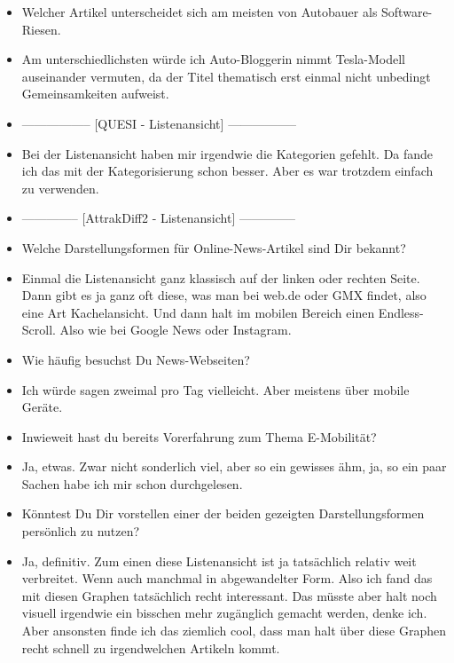{\begin{itemize}[]
        \item {} Welcher Artikel unterscheidet sich am meisten von \flqq Autobauer als Software-Riesen\frqq{}.
        \item {} Am unterschiedlichsten würde ich \flqq Auto-Bloggerin nimmt Tesla-Modell auseinander\frqq{} vermuten, da der Titel thematisch erst einmal nicht unbedingt Gemeinsamkeiten aufweist.
        \item {-----------------} [QUESI - Listenansicht] {-----------------}
        \item {} Bei der Listenansicht haben mir irgendwie die Kategorien gefehlt.
              Da fande ich das mit der Kategorisierung schon besser.
              Aber es war trotzdem einfach zu verwenden.
        \item {--------------} [AttrakDiff2 - Listenansicht] {--------------}
        \item {} Welche Darstellungsformen für Online-News-Artikel sind Dir bekannt?
        \item {} Einmal die Listenansicht ganz klassisch auf der linken oder rechten Seite.
        Dann gibt es ja ganz oft diese, was man bei web.de oder GMX findet, also eine Art Kachelansicht.
        Und dann halt im mobilen Bereich einen Endless-Scroll.
        Also wie bei Google News oder Instagram.
        \item {} Wie häufig besuchst Du News-Webseiten?
        \item {} Ich würde sagen zweimal pro Tag vielleicht. Aber meistens über mobile Geräte.
        \item {} Inwieweit hast du bereits Vorerfahrung zum Thema E-Mobilität?
        \item {} Ja, etwas. Zwar nicht sonderlich viel, aber so ein gewisses ähm, ja, so ein paar Sachen habe ich mir schon durchgelesen.
        \item {} Könntest Du Dir vorstellen einer der beiden gezeigten Darstellungsformen persönlich zu nutzen?
        \item {} Ja, definitiv. Zum einen diese Listenansicht ist ja tatsächlich relativ weit verbreitet.
        Wenn auch manchmal in abgewandelter Form.
        Also ich fand das mit diesen Graphen tatsächlich recht interessant.
        Das müsste aber halt noch visuell irgendwie ein bisschen mehr zugänglich gemacht werden, denke ich.
        Aber ansonsten finde ich das ziemlich cool, dass man halt über diese Graphen recht schnell zu irgendwelchen Artikeln kommt.

\end{itemize}}

